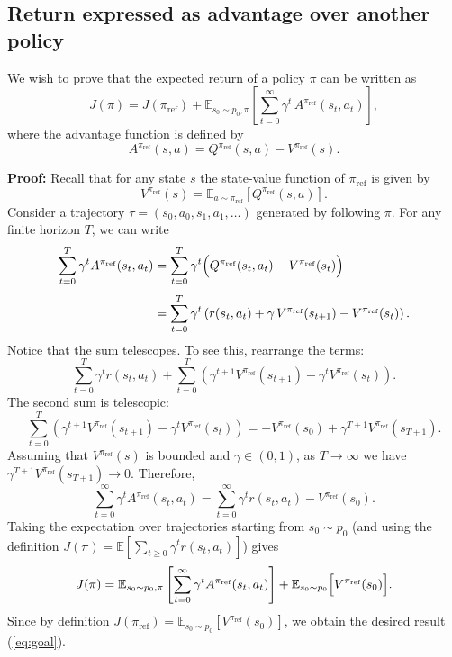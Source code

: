 \subsection{Return expressed as advantage over another policy}

We wish to prove that the expected return of a policy $\pi$ can be written as
\begin{equation}
  J(\pi) = J(\pi_{\text{ref}}) + \mathbb{E}_{s_0\sim p_0,\pi} \left[ \sum_{t=0}^{\infty} \gamma^t \, A^{\pi_{\text{ref}}}(s_t,a_t) \right],
  \label{eq:goal}
\end{equation}
where the advantage function is defined by
\[
  A^{\pi_{\text{ref}}}(s,a) = Q^{\pi_{\text{ref}}}(s,a) - V^{\pi_{\text{ref}}}(s).
\]

\textbf{Proof:} Recall that for any state $s$ the state-value function of $\pi_{\text{ref}}$ is given by
\[
  V^{\pi_{\text{ref}}}(s) = \mathbb{E}_{a\sim\pi_{\text{ref}}} \left[ Q^{\pi_{\text{ref}}}(s,a) \right].
\]
Consider a trajectory $\tau=(s_0,a_0,s_1,a_1,\dots)$ generated by following $\pi$. For any finite horizon $T$, we can write
\begin{align*}
  \sum_{t=0}^{T} \gamma^t A^{\pi_{\text{ref}}}(s_t,a_t)
  &= \sum_{t=0}^{T} \gamma^t \Bigl( Q^{\pi_{\text{ref}}}(s_t,a_t) - V^{\pi_{\text{ref}}}(s_t) \Bigr)\\[1mm]
  &= \sum_{t=0}^{T} \gamma^t \left( r(s_t,a_t) + \gamma\, V^{\pi_{\text{ref}}}(s_{t+1}) - V^{\pi_{\text{ref}}}(s_t) \right).
\end{align*}
Notice that the sum telescopes. To see this, rearrange the terms:
\[
  \sum_{t=0}^{T} \gamma^t r(s_t,a_t)
  + \sum_{t=0}^{T} \left(\gamma^{t+1} V^{\pi_{\text{ref}}}(s_{t+1}) - \gamma^t V^{\pi_{\text{ref}}}(s_t) \right).
\]
The second sum is telescopic:
\[
  \sum_{t=0}^{T} \left(\gamma^{t+1} V^{\pi_{\text{ref}}}(s_{t+1}) - \gamma^t V^{\pi_{\text{ref}}}(s_t) \right)
  = - V^{\pi_{\text{ref}}}(s_0) + \gamma^{T+1} V^{\pi_{\text{ref}}}(s_{T+1}).
\]
Assuming that $V^{\pi_{\text{ref}}}(s)$ is bounded and $\gamma \in (0,1)$, as $T\to\infty$ we have $\gamma^{T+1} V^{\pi_{\text{ref}}}(s_{T+1})\to 0$. Therefore,
\[
  \sum_{t=0}^{\infty} \gamma^t A^{\pi_{\text{ref}}}(s_t,a_t)
  = \sum_{t=0}^{\infty} \gamma^t r(s_t,a_t) - V^{\pi_{\text{ref}}}(s_0).
\]
Taking the expectation over trajectories starting from $s_0 \sim p_0$ (and using the definition $J(\pi)=\mathbb{E}[\sum_{t\ge0}\gamma^t r(s_t,a_t)]$) gives
\[
  J(\pi) = \mathbb{E}_{s_0\sim p_0,\pi} \left[ \sum_{t=0}^{\infty} \gamma^t A^{\pi_{\text{ref}}}(s_t,a_t) \right] + \mathbb{E}_{s_0\sim p_0}\Bigl[ V^{\pi_{\text{ref}}}(s_0) \Bigr].
\]
Since by definition $J(\pi_{\text{ref}})=\mathbb{E}_{s_0\sim p_0}\left[V^{\pi_{\text{ref}}}(s_0)\right]$, we obtain the desired result (\ref{eq:goal}).

